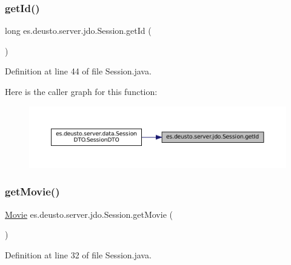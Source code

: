 \subsubsection{\texorpdfstring{getId()}{getId()}}
{\footnotesize\ttfamily long es.\+deusto.\+server.\+jdo.\+Session.\+get\+Id (\begin{DoxyParamCaption}{ }\end{DoxyParamCaption})}



Definition at line 44 of file Session.\+java.

Here is the caller graph for this function\+:\nopagebreak
\begin{figure}[H]
\begin{center}
\leavevmode
\includegraphics[width=350pt]{classes_1_1deusto_1_1server_1_1jdo_1_1_session_ade2b7eec9ef10a4c733aa3f4b18a8fe3_icgraph}
\end{center}
\end{figure}
\mbox{\label{classes_1_1deusto_1_1server_1_1jdo_1_1_session_afdae557964a51e2d6b037db206b344c1}} 
\subsubsection{\texorpdfstring{getMovie()}{getMovie()}}
{\footnotesize\ttfamily \mbox{\hyperlink{classes_1_1deusto_1_1server_1_1jdo_1_1_movie}{Movie}} es.\+deusto.\+server.\+jdo.\+Session.\+get\+Movie (\begin{DoxyParamCaption}{ }\end{DoxyParamCaption})}



Definition at line 32 of file Session.\+java.

